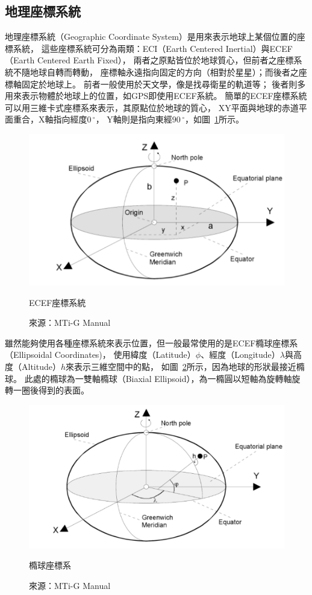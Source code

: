 \subsection{地理座標系統}
地理座標系統（Geographic Coordinate System）是用來表示地球上某個位置的座標系統，
這些座標系統可分為兩類：ECI（Earth Centered Inertial）與ECEF（Earth Centered Earth Fixed），
兩者之原點皆位於地球質心，但前者之座標系統不隨地球自轉而轉動，
座標軸永遠指向固定的方向（相對於星星）；而後者之座標軸固定於地球上。
前者一般使用於天文學，像是找尋衛星的軌道等；
後者則多用來表示物體於地球上的位置，如GPS即使用ECEF系統。
簡單的ECEF座標系統可以用三維卡式座標系來表示，其原點位於地球的質心，
XY平面與地球的赤道平面重合，X軸指向經度$0\,^{\circ}$，
Y軸則是指向東經$90\,^{\circ}$，如圖~\ref{f:ecef}所示。
\begin{figure}[h!]
	\centering
	\includegraphics[width=12cm]{figures/ECEF}
	\caption{ECEF座標系統}
	\caption*{來源：MTi-G Manual}
	\label{f:ecef}
\end{figure}

雖然能夠使用各種座標系統來表示位置，但一般最常使用的是ECEF橢球座標系（Ellipsoidal Coordinates)，
使用緯度（Latitude）$\phi$、經度（Longitude）$\lambda$與高度（Altitude）$h$來表示三維空間中的點，
如圖~\ref{f:ellipsoid}所示，因為地球的形狀最接近橢球。
此處的橢球為一雙軸橢球（Biaxial Ellipsoid），為一橢圓以短軸為旋轉軸旋轉一圈後得到的表面。
\begin{figure}[h!]
	\centering
	\includegraphics[width=12cm]{figures/ellipsoid}
	\caption{橢球座標系}
	\caption*{來源：MTi-G Manual}
	\label{f:ellipsoid}
\end{figure}

